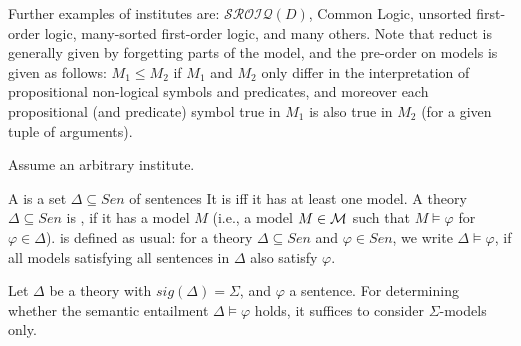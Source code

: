 \documentclass[%
\ifpretendfinal
final%
\else
draft%
\fi,
a4paper,
wd]{isov2}
\begin{document}
Further examples of institutes are: $\mathcal{SROIQ}(D)$, Common
Logic, unsorted first-order logic, many-sorted first-order logic, and
many others.  Note that reduct is generally given by forgetting parts
of the model, and the pre-order on models is given as follows:
$M_1\leq M_2$ if $M_1$ and $M_2$ only differ in the interpretation of
propositional non-logical symbols and predicates, and moreover each propositional
(and predicate) symbol true in $M_1$ is also true in $M_2$ (for a
given tuple of arguments).

Assume an arbitrary institute.

A  is a set $\Delta\subseteq Sen$ of sentences
It is  iff it has at least one model.
A theory $\Delta\subseteq Sen$ is , if it has a model
$M$ (i.e., a model $M \in \cM$
such that $M\models\varphi$ for $\varphi\in\Delta$).
 is defined as usual: for 
a theory $\Delta\subseteq Sen$ and $\varphi\in Sen$, we write
$\Delta\models\varphi$, if all models satisfying all sentences in
$\Delta$ also satisfy $\varphi$.


\begin{lemma}
  Let $\Delta$ be a theory with $sig(\Delta)=\Sigma$, and $\varphi$ a
  sentence. For determining whether the semantic entailment
  $\Delta\models\varphi$ holds, it suffices to consider
  $\Sigma$-models only.
\end{lemma}
\end{document}
